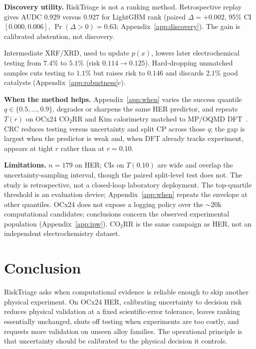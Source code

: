 \documentclass{article}
\begin{document}
\textbf{Discovery utility.}
RiskTriage is not a ranking method.
Retrospective replay gives AUDC $0.929$ versus $0.927$ for LightGBM rank (paired $\Delta=+0.002$, 95\% CI $[0.000,0.006]$, $\Pr(\Delta>0)=0.63$; Appendix~\ref{app:discovery}).
The gain is calibrated abstention, not discovery.

Intermediate XRF/XRD, used to update $p(x)$, lowers later electrochemical testing from $7.4\%$ to $5.1\%$ (risk $0.114\to 0.125$).
Hard-dropping unmatched samples cuts testing to $1.1\%$ but raises risk to $0.146$ and discards $2.1\%$ good catalysts (Appendix~\ref{app:robustness}c).

\textbf{When the method helps.}
Appendix~\ref{app:when} varies the success quantile $q\in\{0.5,\ldots,0.9\}$, degrades or sharpens the same HER predictor, and repeats $T(r)$ on OCx24 CO$_2$RR and Kim calorimetry matched to MP/OQMD DFT~\citep{kim2017enthalpy}.
CRC reduces testing versus uncertainty and split CP across those $q$; the gap is largest when the predictor is weak and, when DFT already tracks experiment, appears at tight $r$ rather than at $r=0.10$.

\textbf{Limitations.}
$n=179$ on HER; CIs on $T(0.10)$ are wide and overlap the uncertainty-sampling interval, though the paired split-level test does not.
The study is retrospective, not a closed-loop laboratory deployment.
The top-quartile threshold is an evaluation device; Appendix~\ref{app:when} repeats the envelope at other quantiles.
OCx24 does not expose a logging policy over the ${\sim}20$k computational candidates; conclusions concern the observed experimental population (Appendix~\ref{app:ipw}).
CO$_2$RR is the same campaign as HER, not an independent electrochemistry dataset.

\section{Conclusion}

RiskTriage asks when computational evidence is reliable enough to skip another physical experiment.
On OCx24 HER, calibrating uncertainty to decision risk reduces physical validation at a fixed scientific-error tolerance, leaves ranking essentially unchanged, shuts off testing when experiments are too costly, and requests more validation on unseen alloy families.
The operational principle is that uncertainty should be calibrated to the physical decision it controls.



\end{document}
